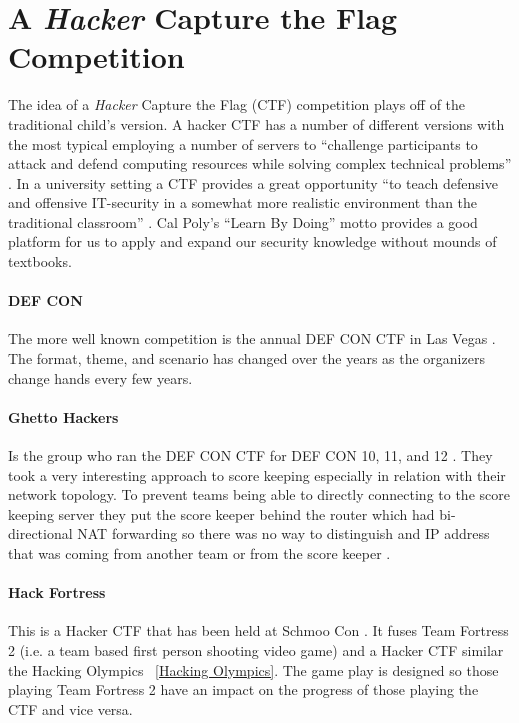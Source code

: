 \documentclass[10pt]{article}
\begin{document}
\section{A \textit{Hacker} Capture the Flag Competition}
The idea of a \textit{Hacker} Capture the Flag (CTF) competition plays off of
the traditional child's version. A hacker CTF has a number of different versions
with the most typical employing a number of servers to ``challenge participants
to attack and defend computing resources while solving complex technical
problems'' \cite{HackingCompetitionsForSecurityEducation}. In a university
setting a CTF provides a great opportunity ``to teach defensive and offensive
IT-security in a somewhat more realistic environment than the traditional
classroom'' \cite{HostingHackingChallenge}. Cal Poly's ``Learn By Doing'' motto
provides a good platform for us to apply and expand our security knowledge
without mounds of textbooks.

\paragraph*{DEF CON} The more well known competition is the annual DEF CON CTF
in Las Vegas \cite{DEFCONCTF}. The format, theme, and scenario has changed over
the years as the organizers change hands every few years.

\paragraph*{Ghetto Hackers} 
\label{GhettoHackers}
Is the group who ran the DEF CON CTF for DEF CON 10, 11, and 12
\cite{BlackHat2004}. They took a very interesting approach to score keeping especially in 
relation with their network topology. To prevent teams being able to directly connecting to 
the score keeping server they  put the score keeper behind the router which had bi-directional
 NAT forwarding so there was no way to distinguish and IP address that was coming from another
 team or from the score keeper \cite{BlackHat2004}.

\paragraph*{Hack Fortress} This is a Hacker CTF that has been held at Schmoo Con 
\cite{HackFortress}. It fuses Team Fortress 2 (i.e. a team based first person shooting
video game) and a Hacker CTF similar the Hacking Olympics ~\ref{Hacking Olympics}. 
The game play is designed so those playing Team Fortress 2 have an impact on the progress of
 those playing the CTF and vice versa.
\end{document}
